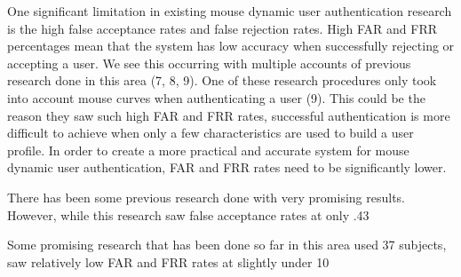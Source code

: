 \documentclass[conference]{IEEEtran}
\begin{document}
One significant limitation in existing mouse dynamic user authentication research is the high false acceptance rates and false rejection rates. High FAR and FRR percentages mean that the system has low accuracy when successfully rejecting or accepting a user. We see this occurring with multiple accounts of previous research done in this area (7, 8, 9). One of these research procedures only took into account mouse curves when authenticating a user (9). This could be the reason they saw such high FAR and FRR rates, successful authentication is more difficult to achieve when only a few characteristics are used to build a user profile. In order to create a more practical and accurate system for mouse dynamic user authentication, FAR and FRR rates need to be significantly lower.

There has been some previous research done with very promising results. However, while this research saw false acceptance rates at only .43%

Some promising research that has been done so far in this area used 37 subjects, saw relatively low FAR and FRR rates at slightly under 10%
\end{document}
